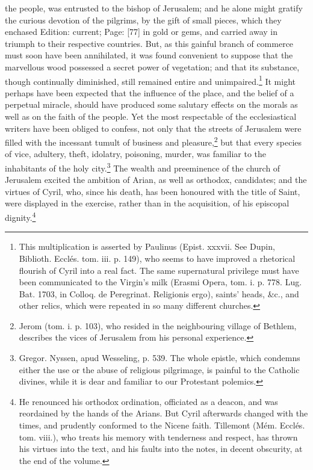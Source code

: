 the people, was entrusted to the bishop of Jerusalem; and he alone might gratify the curious devotion of the pilgrims, by the gift of small pieces, which they enchased Edition: current; Page: [77] in gold or gems, and carried away in triumph to their respective countries. But, as this gainful branch of commerce must soon have been annihilated, it was found convenient to suppose that the marvellous wood possessed a secret power of vegetation; and that its substance, though continually diminished, still remained entire and unimpaired.\footnote{This multiplication is asserted by Paulinus (Epist. xxxvii. See Dupin, Biblioth. Ecclés. tom. iii. p. 149), who seems to have improved a rhetorical flourish of Cyril into a real fact. The same supernatural privilege must have been communicated to the Virgin\texthebrew{}’s milk (Erasmi Opera, tom. i. p. 778. Lug. Bat. 1703, in Colloq. de Peregrinat. Religionis ergo), saints\texthebrew{}’ heads, \&c., and other relics, which were repeated in so many different churches.} It might perhaps have been expected that the influence of the place, and the belief of a perpetual miracle, should have produced some salutary effects on the morals as well as on the faith of the people. Yet the most respectable of the ecclesiastical writers have been obliged to confess, not only that the streets of Jerusalem were filled with the incessant tumult of business and pleasure,\footnote{Jerom (tom. i. p. 103), who resided in the neighbouring village of Bethlem, describes the vices of Jerusalem from his personal experience.} but that every species of vice, adultery, theft, idolatry, poisoning, murder, was familiar to the inhabitants of the holy city.\footnote{Gregor. Nyssen, apud Wesseling, p. 539. The whole epistle, which condemns either the use or the abuse of religious pilgrimage, is painful to the Catholic divines, while it is dear and familiar to our Protestant polemics.} The wealth and preeminence of the church of Jerusalem excited the ambition of Arian, as well as orthodox, candidates; and the virtues of Cyril, who, since his death, has been honoured with the title of Saint, were displayed in the exercise, rather than in the acquisition, of his episcopal dignity.\footnote{He renounced his orthodox ordination, officiated as a deacon, and was reordained by the hands of the Arians. But Cyril afterwards changed with the times, and prudently conformed to the Nicene faith. Tillemont (Mém. Ecclés. tom. viii.), who treats his memory with tenderness and respect, has thrown his virtues into the text, and his faults into the notes, in decent obscurity, at the end of the volume.}

